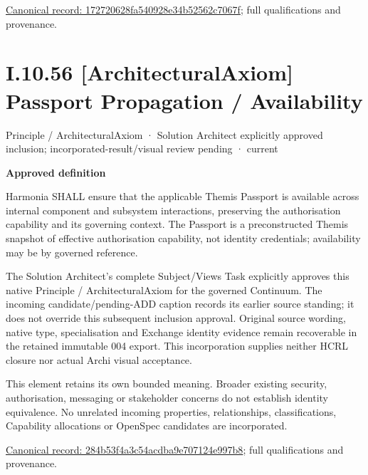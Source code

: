 {\footnotesize \href{../../../../../../../../continuum/motivation/principle/architectural-axiom/172720628fa540928e34b52562c7067f.md}{Canonical record: 172720628fa540928e34b52562c7067f}; full qualifications and provenance.}\par
\section*{I.10.56 [ArchitecturalAxiom] Passport Propagation / Availability}
\label{navigation:I.10.56}

\label{element:284b53f4a3c54acdba9e707124e997b8}
{\small Principle / ArchitecturalAxiom · Solution Architect explicitly approved inclusion; incorporated-result/visual review pending · current}\par

\par\medskip\textbf{Approved definition}\par


Harmonia SHALL ensure that the applicable Themis Passport is available across internal component and subsystem interactions, preserving the authorisation capability and its governing context. The Passport is a preconstructed Themis snapshot of effective authorisation capability, not identity credentials; availability may be by governed reference.



The Solution Architect's complete Subject/Views Task explicitly approves this
native Principle / ArchitecturalAxiom for the governed Continuum.
The incoming candidate/pending-ADD caption records its earlier source standing;
it does not override this subsequent inclusion approval. Original source wording,
native type, specialisation and Exchange identity evidence remain recoverable in
the retained immutable 004 export. This incorporation supplies neither HCRL closure
nor actual Archi visual acceptance.



This element retains its own bounded meaning. Broader existing security,
authorisation, messaging or stakeholder concerns do not establish identity
equivalence. No unrelated incoming properties, relationships, classifications,
Capability allocations or OpenSpec candidates are incorporated.


{\footnotesize \href{../../../../../../../../continuum/motivation/principle/architectural-axiom/284b53f4a3c54acdba9e707124e997b8.md}{Canonical record: 284b53f4a3c54acdba9e707124e997b8}; full qualifications and provenance.}\par
